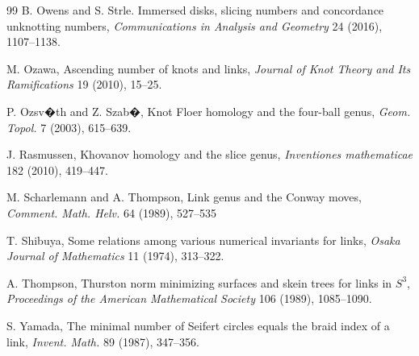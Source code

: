 \documentclass[pdftex, a4paper, 12pt, oneside]{amsart}
\numberwithin{equation}{section}
\theoremstyle{plain}
\theoremstyle{definition}
\begin{document}
\begin{thebibliography}{99}
		 B. Owens and S. Strle. Immersed disks, slicing numbers and concordance unknotting numbers, \emph{Communications in Analysis and Geometry} 24 (2016), 1107--1138.
		
		 M. Ozawa, Ascending number of knots and links, \emph{Journal of Knot Theory and Its Ramifications} 19 (2010), 15--25.
		
		 P. Ozsv�th and Z. Szab�, Knot Floer homology and the four-ball genus, \emph{Geom. Topol.} 7 (2003), 615--639.
		
		 J. Rasmussen, Khovanov homology and the slice genus, \emph{Inventiones mathematicae} 182 (2010), 419--447.
		
		 M. Scharlemann and A. Thompson, Link genus and the Conway moves, \emph{Comment. Math. Helv.} 64 (1989), 527--535
		
		 T. Shibuya, Some relations among various numerical invariants for links, \emph{Osaka Journal of Mathematics} 11 (1974), 313--322.
		
		 A. Thompson, Thurston norm minimizing surfaces and skein trees for links in $S^3$, \emph{Proceedings of the American Mathematical Society} 106 (1989), 1085--1090.
		
		 S. Yamada, The minimal number of Seifert circles equals the braid index of a link, \emph{Invent. Math.} 89 (1987), 347--356.











	\end{thebibliography}
	
\end{document}
